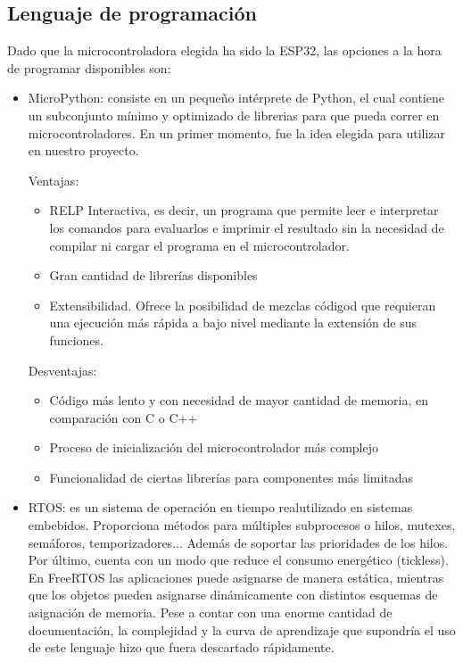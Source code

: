 \documentclass[runningheads]{llncs}
\begin{document}
\subsection*{Lenguaje de programación}

Dado que la microcontroladora elegida ha sido la ESP32, las opciones a la hora de programar disponibles son:

\begin{itemize}
    \item MicroPython: consiste en un pequeño intérprete de Python, el cual contiene un subconjunto mínimo y optimizado de librerias para que pueda correr en microcontroladores.
    En un primer momento, fue la idea elegida para utilizar en nuestro proyecto.
    
    Ventajas:
    \begin{itemize}
        \item RELP Interactiva, es decir, un programa que permite leer e interpretar los comandos para evaluarlos e imprimir el resultado sin la necesidad de compilar ni cargar el programa en el microcontrolador.
        \item Gran cantidad de librerías disponibles
        \item Extensibilidad. Ofrece la posibilidad de mezclas códigod que requieran una ejecución más rápida a bajo nivel mediante la extensión de sus funciones.
    \end{itemize}
    
    Desventajas:
    \begin{itemize}
        \item Código más lento y con necesidad de mayor cantidad de memoria, en comparación con C o C++
        \item Proceso de inicialización del microcontrolador más complejo
        \item Funcionalidad de ciertas librerías para componentes más limitadas
    \end{itemize}
     
    \item RTOS: es un sistema de operación en tiempo realutilizado en sistemas embebidos. Proporciona métodos para múltiples subprocesos o hilos, mutexes, semáforos, temporizadores... Además de soportar las prioridades de los hilos. Por último, cuenta con un modo que reduce el consumo energético (tickless). En FreeRTOS las aplicaciones puede asignarse de manera estática, mientras que los objetos pueden asignarse dinámicamente con distintos esquemas de asignación de memoria. 
    Pese a contar con una enorme cantidad de documentación, la complejidad y la curva de aprendizaje que supondría el uso de este lenguaje hizo que fuera descartado rápidamente.
    

\end{itemize}
\end{document}
